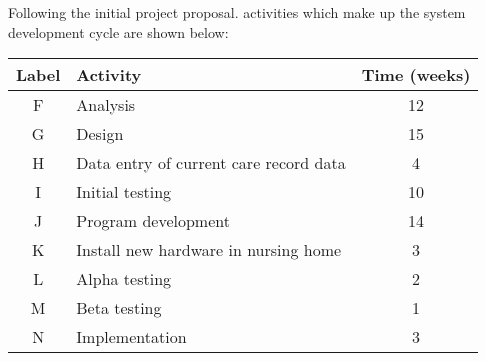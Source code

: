 Following the initial project proposal. activities which make up the
system development cycle are shown below:
\begin{center}
\begin{tabular}{|c|>{\raggedright}p{}|c|}
\hline 
\textbf{Label} & \texttt{\textbf{\hspace{0.01\columnwidth}}}\textbf{Activity} & \textbf{Time (weeks)}\tabularnewline
\hline 
F & Analysis & 12\tabularnewline
\hline 
G & Design & 15\tabularnewline
\hline 
H & Data entry of current care record data & 4\tabularnewline
\hline 
I & Initial testing & 10\tabularnewline
\hline 
J & Program development  & 14\tabularnewline
\hline 
K & Install new hardware in nursing home  & 3\tabularnewline
\hline 
L & Alpha testing & 2\tabularnewline
\hline 
M & Beta testing & 1\tabularnewline
\hline 
N & Implementation & 3\tabularnewline
\hline 
\end{tabular}
\par\end{center}

